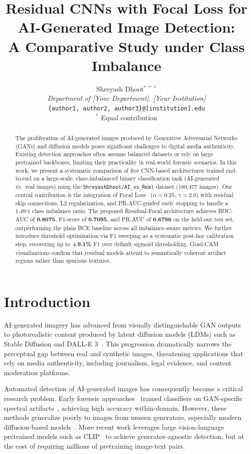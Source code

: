 \documentclass[10pt,twocolumn]{article}
\title{\textbf{Residual CNNs with Focal Loss for AI-Generated Image Detection:\\
A Comparative Study under Class Imbalance}}
\author{
  Shreyash Dhoot$^{*}$ \quad [Co-Author 2]$^{*}$ \quad [Co-Author 3]$^{*}$ \\
  \textit{Department of [Your Department], [Your Institution]} \\
  \texttt{\{author1, author2, author3\}@[institution].edu} \\
  \small $^{*}$ Equal contribution
}
\date{}
\begin{document}
\maketitle

\begin{abstract}
The proliferation of AI-generated images produced by Generative Adversarial Networks (GANs)
and diffusion models poses significant challenges to digital media authenticity.
Existing detection approaches often assume balanced datasets or rely on large pretrained
backbones, limiting their practicality in real-world forensic scenarios.
In this work, we present a systematic comparison of five CNN-based architectures trained
end-to-end on a large-scale, class-imbalanced binary classification task
(AI-generated vs.\ real images) using the
\texttt{ShreyashDhoot/AI\_vs\_Real} dataset (180,477 images).
Our central contribution is the integration of Focal Loss~\cite{lin2017focal}
($\alpha{=}0.25$, $\gamma{=}2.0$) with residual skip connections, L2 regularization,
and PR-AUC-guided early stopping to handle a 1.49:1 class imbalance ratio.
The proposed Residual-Focal architecture achieves ROC-AUC of \textbf{0.8075},
F1-score of \textbf{0.7095}, and PR-AUC of \textbf{0.6786} on the held-out test set,
outperforming the plain BCE baseline across all imbalance-aware metrics.
We further introduce threshold optimization via F1 sweeping as a systematic
post-hoc calibration step, recovering up to \textbf{+9.1\%} F1 over default sigmoid
thresholding. Grad-CAM visualizations confirm that residual models attend to
semantically coherent artifact regions rather than spurious textures.
\end{abstract}

\section{Introduction}
\label{sec:intro}

AI-generated imagery has advanced from visually distinguishable GAN outputs to
photorealistic content produced by latent diffusion models (LDMs)
such as Stable Diffusion and DALL-E 3~\cite{rombach2022ldm}.
This progression dramatically narrows the perceptual gap between real and synthetic
images, threatening applications that rely on media authenticity, including journalism,
legal evidence, and content moderation platforms.

Automated detection of AI-generated images has consequently become a critical research
problem. Early forensic approaches~\cite{wang2020cnn} trained classifiers on GAN-specific
spectral artifacts~\cite{frank2020frequency}, achieving high accuracy within-domain.
However, these methods generalize poorly to images from unseen generators,
especially modern diffusion-based models~\cite{wang2023dire}.
More recent work leverages large vision-language pretrained models such as
CLIP~\cite{ojha2023unifd} to achieve generator-agnostic detection, but at the cost of
requiring millions of pretraining image-text pairs.
\end{document}
